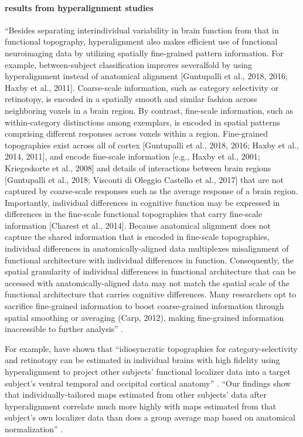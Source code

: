 \paragraph{results from hyperalignment studies}
%
``Besides separating interindividual variability in brain function from that in
functional topography, hyperalignment also makes efficient use of functional
neuroimaging data by utilizing spatially fine-grained pattern information. For
example, between-subject classification improves severalfold by using
hyperalignment instead of anatomical alignment [Guntupalli et al., 2018, 2016;
Haxby et al., 2011]. Coarse-scale information, such as category selectivity or
retinotopy, is encoded in a spatially smooth and similar fashion across
neighboring voxels in a brain region. By contrast, fine-scale information, such
as within-category distinctions among exemplars, is encoded in spatial
patterns comprising different responses across voxels within a region.
Fine-grained topographies exist across all of cortex [Guntupalli et al., 2018,
2016; Haxby et al., 2014, 2011], and encode fine-scale information [e.g., Haxby
et al., 2001; Kriegeskorte et al., 2008] and details of interactions between
brain regions [Guntupalli et al., 2018; Visconti di Oleggio Castello et al.,
2017] that are not captured by coarse-scale responses such as the average
response of a brain region. Importantly, individual differences in cognitive
function may be expressed in differences in the fine-scale functional
topographies that carry fine-scale information [Charest et al., 2014]. Because
anatomical alignment does not capture the shared information that is encoded in
fine-scale topographies, individual differences in anatomically-aligned data
multiplexes misalignment of functional architecture with individual
differences in function. Consequently, the spatial granularity of individual
differences in functional architecture that can be accessed with
anatomically-aligned data may not match the spatial scale of the functional
architecture that carries cognitive differences. Many researchers opt to
sacrifice fine-grained information to boost coarse-grained information through
spatial smoothing or averaging (Carp, 2012), making fine-grained information
inaccessible to further analysis'' \citep{feilong2018reliable}.

%
For example, \citet{haxby2011common, guntupalli2016model} have shown that
``idiosyncratic topographies for category-selectivity and retinotopy can be
estimated in individual brains with high fidelity using hyperalignment to
project other subjects' functional localizer data into a target subject's
ventral temporal and occipital cortical anatomy'' \citep{jiahui2020predicting}.
%
``Our findings show that individually-tailored maps estimated from other
subjects’ data after hyperalignment correlate much more highly with maps
estimated from that subject's own localizer data than does a group average map
based on anatomical normalization'' \citep{jiahui2020predicting}.


